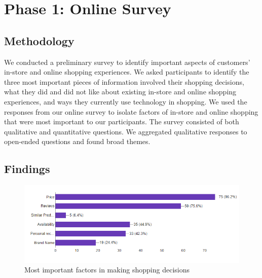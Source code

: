 \section{Phase 1: Online Survey}
\subsection{Methodology}
We conducted a preliminary survey to identify important aspects of customers' in-store and online shopping experiences. We asked participants to identify the three most important pieces of information involved their shopping decisions, what they did and did not like about existing in-store and online shopping experiences, and ways they currently use technology in shopping.   
We used the responses from our online survey to isolate factors of in-store and online shopping that were most important to our participants.  The survey consisted of both qualitative and quantitative questions.  We aggregated qualitative responses to open-ended questions and found broad themes.     


\subsection{Findings}
\begin{figure}
	\includegraphics[width=0.9\columnwidth]{figures/ShoppingFactors}
	\caption{Most important factors in making shopping decisions}
	\label{figures:ShoppingFactors}
\end{figure}

